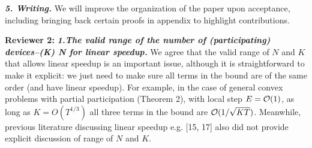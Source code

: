 \documentclass{article}
\begin{document}
\textbf{\textit{5. Writing.}} 
We will improve the organization of the paper upon acceptance, including bringing back certain proofs in appendix to highlight contributions.
\vspace{-1.5mm}



% 
{\color{blue}\textbf{Reviewer 2:}} 
\textbf{\textit{1.The valid range of the number of (participating) devices--(K) N for linear speedup.}} We agree that the valid range of $N$ and $K$ that allows linear speedup is an important issue, although it is straightforward to make it explicit: we just need to make sure all terms in the bound are of the same order (and have linear speedup). For example, in the case of general convex problems with partial participation (Theorem 2), with local step $E={\mathcal{O}}(1)$, as long as $K=O(T^{1/3})$ all three terms in the bound are ${\mathcal{O}}(1/\sqrt{KT})$. Meanwhile, previous literature discussing linear speedup e.g. [15, 17] also did not provide explicit discussion of range of $N$ and $K$.


% 
\vspace{-1.5mm}
\end{document}
